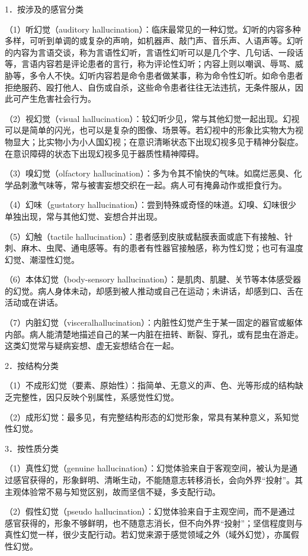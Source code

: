 1．按涉及的感官分类

（1）听幻觉（auditory
hallucination）：临床最常见的一种幻觉。幻听的内容多种多样，可听到单调的或复杂的声响，如机器声、敲门声、音乐声、人语声等。幻听的内容为言语交谈，称为言语性幻听，言语性幻听可以是几个字、几句话、一段话等，言语内容若是评论患者的言行，称为评论性幻听；内容上则以嘲讽、辱骂、威胁等，多令人不快。幻听内容若是命令患者做某事，称为命令性幻听。如命令患者拒绝服药、殴打他人、自伤或自杀，这些命令患者往往无法违抗，无条件服从，因此可产生危害社会行为。

（2）视幻觉（visual
hallucination）：较幻听少见，常与其他幻觉一起出现。幻视可以是简单的闪光，也可以是复杂的图像、场景等。若幻视中的形象比实物大为视物显大；比实物小为小人国幻视；在意识清晰状态下出现幻视多见于精神分裂症。在意识障碍的状态下出现幻视多见于器质性精神障碍。

（3）嗅幻觉（olfactory
hallucination）：多为令其不愉快的气味。如腐烂恶臭、化学品刺激气味等，常与被害妄想交织在一起。病人可有掩鼻动作或拒食行为。

（4）幻味（gustatory
hallucination）：尝到特殊或奇怪的味道。幻嗅、幻味很少单独出现，常与其他幻觉、妄想合并出现。

（5）幻触（tactile
hallucination）：患者感到皮肤或黏膜表面或底下有接触、针刺、麻木、虫爬、通电感等。有的患者有性器官接触感，称为性幻觉；也可有温度幻觉、潮湿性幻觉。

（6）本体幻觉（body-sensory
hallucination）：是肌肉、肌腱、关节等本体感受器的幻觉。病人身体未动，却感到被人推动或自己在运动；未讲话，却感到口、舌在活动或在讲话。

（7）内脏幻觉（visceralhallucination）：内脏性幻觉产生于某一固定的器官或躯体内部。病人能清楚地描述自己的某一内脏在扭转、断裂、穿孔，或有昆虫在游走。这类幻觉常与疑病妄想、虚无妄想结合在一起。

2．按结构分类

（1）不成形幻觉（要素、原始性）：指简单、无意义的声、色、光等形成的结构缺乏完整性，因只反映个别属性，系感觉性幻觉。

（2）成形幻觉：最多见，有完整结构形态的幻觉形象，常具有某种意义，系知觉性幻觉。

3．按性质分类

（1）真性幻觉（genuine
hallucination）：幻觉体验来自于客观空间，被认为是通过感官获得的，形象鲜明、清晰生动，不能随意志转移消长，会向外界``投射''。其主观体验常不易与知觉区别，故而坚信不疑，多支配行动。

（2）假性幻觉（pseudo
hallucination）：幻觉体验来自于主观空间，而不是通过感官获得的，形象不够鲜明，也不随意志消长，但不向外界``投射''；坚信程度则与真性幻觉一样，很少支配行动。若幻觉来源于感觉领域之外（域外幻觉），亦属假性幻觉。

